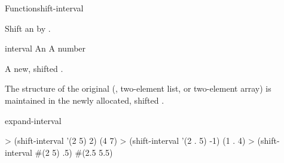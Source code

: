 \documentclass[10pt,twoside,english,pdftex]{article}
\begin{document}

\begin{functiondoc}{Function}{shift-interval}%
  { \returns{} }
%
%

\fnsyntax

\fnpurpose Shift an  by .

\fnpackage {}

\fnmodule {}

\fnargs
\begin{args}{interval}
\arg[interval] An 
\arg[amount] A number
\end{args}

\fnreturns A new, shifted .

\fndescription The structure of the original 
(, two-element list, or two-element array) is maintained in the
newly allocated, shifted .

\begin{alsos}{expand-interval}
\end{alsos}

\fnexamples
\begin{example}
> (shift-interval '(2 5) 2)
(4 7)
> (shift-interval '(2 . 5) -1)
(1 . 4)
> (shift-interval #(2 5) .5)
#(2.5 5.5)
\end{example}

\end{functiondoc}

\end{document}
